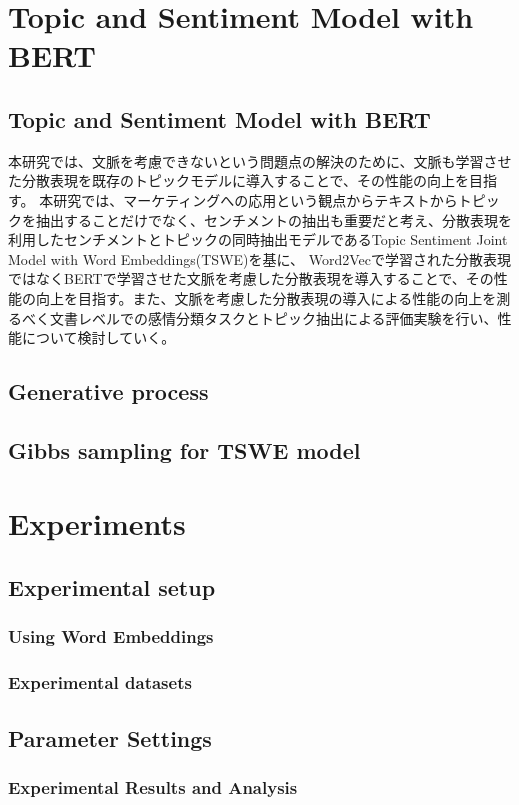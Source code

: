\documentclass[uplatex]{jsarticle}
\begin{document}
\section{Topic and Sentiment Model with BERT}
\subsection{Topic and Sentiment Model with BERT}
本研究では、文脈を考慮できないという問題点の解決のために、文脈も学習させた分散表現を既存のトピックモデルに導入することで、その性能の向上を目指す。
本研究では、マーケティングへの応用という観点からテキストからトピックを抽出することだけでなく、センチメントの抽出も重要だと考え、分散表現を利用したセンチメントとトピックの同時抽出モデルであるTopic Sentiment Joint Model with Word Embeddings(TSWE)\cite{TSWE}を基に、
Word2Vecで学習された分散表現ではなくBERTで学習させた文脈を考慮した分散表現を導入することで、その性能の向上を目指す。また、文脈を考慮した分散表現の導入による性能の向上を測るべく文書レベルでの感情分類タスクとトピック抽出による評価実験を行い、性能について検討していく。

\subsection{Generative process}
\subsection{Gibbs sampling for TSWE model}

\section{Experiments}
\subsection{Experimental setup}
\subsubsection{Using Word Embeddings}
\subsubsection{Experimental datasets}
\subsection{Parameter Settings}

\subsubsection{Experimental Results and Analysis}
\end{document}
